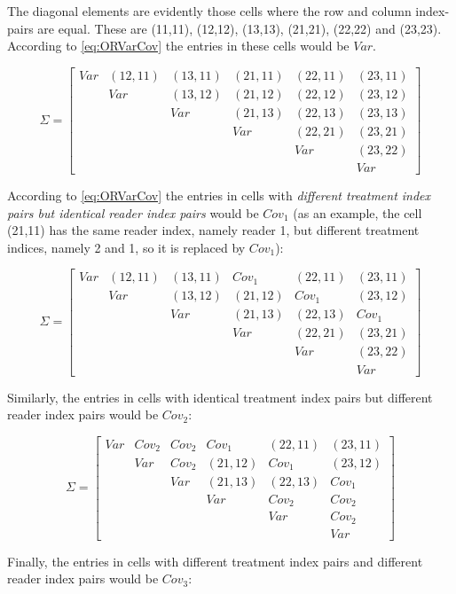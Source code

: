 \documentclass[
]{book}
\begin{document}
The diagonal elements are evidently those cells where the row and column index-pairs are equal. These are (11,11), (12,12), (13,13), (21,21), (22,22) and (23,23). According to \eqref{eq:ORVarCov} the entries in these cells would be \(Var\).

\[
\Sigma=
\begin{bmatrix}
Var & (12,11) & (13,11) & (21,11) & (22,11) & (23,11) \\
 & Var & (13,12) & (21,12) & (22,12) & (23,12) \\ 
 & & Var & (21,13) & (22,13) & (23,13) \\ 
 & & & Var & (22,21) & (23,21) \\
 & & & & Var & (23,22) \\ 
 & & & & & Var
\end{bmatrix}
\]

According to \eqref{eq:ORVarCov} the entries in cells with \emph{different treatment index pairs but identical reader index pairs} would be \(Cov_1\) (as an example, the cell (21,11) has the same reader index, namely reader 1, but different treatment indices, namely 2 and 1, so it is replaced by \(Cov_1\)):

\[
\Sigma=
\begin{bmatrix}
Var & (12,11) & (13,11) & Cov_1 & (22,11) & (23,11) \\
 & Var & (13,12) & (21,12) & Cov_1 & (23,12) \\ 
 & & Var & (21,13) & (22,13) & Cov_1 \\ 
 & & & Var & (22,21) & (23,21) \\
 & & & & Var & (23,22) \\ 
 & & & & & Var
\end{bmatrix}
\]

Similarly, the entries in cells with identical treatment index pairs but different reader index pairs would be \(Cov_2\):

\[
\Sigma=
\begin{bmatrix}
Var & Cov_2 & Cov_2 & Cov_1 & (22,11) & (23,11) \\
 & Var & Cov_2 & (21,12) & Cov_1 & (23,12) \\ 
 &  & Var & (21,13) & (22,13) & Cov_1 \\ 
 &  &  & Var & Cov_2 & Cov_2 \\
 &  &  &  & Var & Cov_2 \\ 
 &  &  &  &  & Var
\end{bmatrix}
\]

Finally, the entries in cells with different treatment index pairs and different reader index pairs would be \(Cov_3\):
\end{document}
